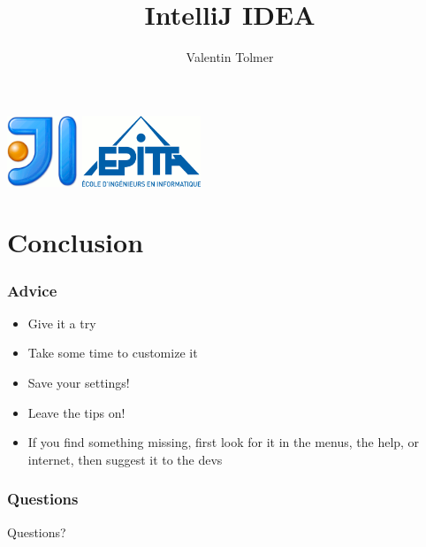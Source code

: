 \documentclass{beamer}
\title{IntelliJ IDEA}
\author{Valentin Tolmer}
\date{}
\institute{GCONFS -- EPITA 2014}
\newlength{\wideitemsep}
\let\olditem\item
\renewcommand{\item}{\setlength{\itemsep}{\wideitemsep}\olditem}
\begin{document}
\begin{frame}
  \titlepage
    \includegraphics[height=60pt]{Logo-idea.png}
    \hfill
    \includegraphics[height=60pt]{Logo-epita.png}
\end{frame}

\begin{frame}
  \tableofcontents[]
\end{frame}





\section{Conclusion}
\begin{frame}
\frametitle{Advice}
  \begin{itemize}
    \item Give it a try
    \item Take some time to customize it
    \item Save your settings!
    \item Leave the tips on!
    \item If you find something missing, first look for it in the menus, the
    help, or internet, then suggest it to the devs
  \end{itemize}
\end{frame}

\begin{frame}
\frametitle{Questions}
  Questions?
\end{frame}
\end{document}
